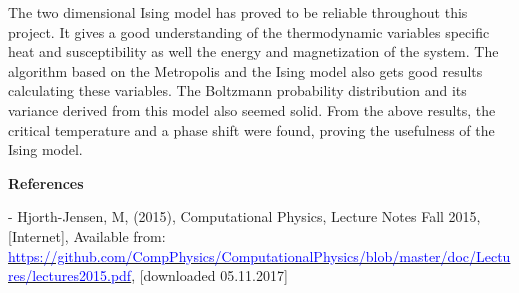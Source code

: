\documentclass[10pt,a4paper]{article}
\begin{document}
\noindent The two dimensional Ising model has proved to be reliable throughout this project. It gives a good understanding of the thermodynamic variables specific heat and susceptibility as well the energy and magnetization of the system. The algorithm based on the Metropolis and the Ising model also gets good results calculating these variables. The Boltzmann probability distribution and its variance derived from this model also seemed solid. From the above results, the critical temperature and a phase shift were found, proving the usefulness of the Ising model.

\newpage

\begin{center}
{\LARGE\bf References}
\end{center}

\noindent - Hjorth-Jensen, M, (2015), Computational Physics, Lecture Notes Fall 2015, [Internet], Available from: \href{https://github.com/CompPhysics/ComputationalPhysics/blob/master/doc/Lectures/lectures2015.pdf}{\textcolor{blue}{https://github.com/CompPhysics/ComputationalPhysics/blob/master/doc/Lectures/lectures2015.pdf}}, [downloaded 05.11.2017]
\end{document}
